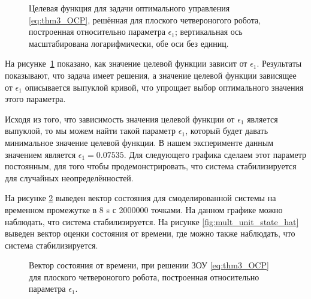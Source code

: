 \begin{figure}[ht]
	\caption{Целевая функция для задачи оптимального управления \eqref{eq:thm3_OCP}, решённая для плоского четвероногого робота, построенная относительно параметра $\epsilon_1$; вертикальная ось масштабирована логарифмически, обе оси без единиц.}\label{fig:mult_unit_cost}
\end{figure} 

На рисунке~\ref{fig:mult_unit_cost} показано, как значение целевой функции зависит от $\epsilon_1$. Результаты показывают, что задача имеет решения, а значение целевой функции зависящее от $\epsilon_1$ описывается выпуклой кривой, что упрощает выбор оптимального значения этого параметра. 

Исходя из того, что зависимость значения целевой функции от $\epsilon_1$ является выпуклой, то мы можем найти такой параметр $\epsilon_1$, который будет давать минимальное значение целевой функции. В нашем эксперименте данным значением является $\epsilon_1 = 0.07535$. Для следующего графика сделаем этот параметр постоянным, для того чтобы продемонстрировать, что система стабилизируется для случайных неопределённостей. 

На рисунке \ref{fig:mult_unit_state} выведен вектор состояния для смоделированной системы на временном промежутке в \num{8} \si{\second} с \num{2000000} точками. На данном графике можно наблюдать, что система стабилизируется. На рисунке \ref{fig:mult_unit_state_hat} выведен вектор оценки состояния от времени, где можно также наблюдать, что система стабилизируется. 

\begin{figure}[ht]
	\caption{Вектор состояния от времени, при решении ЗОУ \eqref{eq:thm3_OCP} для плоского четвероногого робота, построенная относительно параметра $\epsilon_1$.}\label{fig:mult_unit_state}
\end{figure} 

